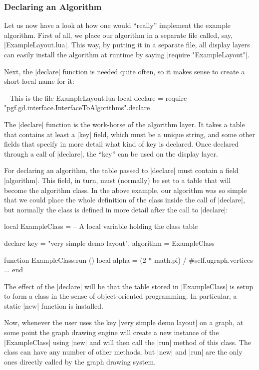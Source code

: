\subsubsection{Declaring an Algorithm}

Let us now have a look at how one would ``really'' implement the example
algorithm. First of all, we place our algorithm in a separate file called, say,
|ExampleLayout.lua|. This way, by putting it in a separate file, all display
layers can easily install the algorithm at runtime by saying
|require "ExampleLayout"|.

Next, the |declare| function is needed quite often, so it makes sense to create
a short local name for it:
%
\begin{codeexample}[code only, tikz syntax=false]
-- This is the file ExampleLayout.lua
local declare = require "pgf.gd.interface.InterfaceToAlgorithms".declare
\end{codeexample}

The |declare| function is the work-horse of the algorithm layer. It takes a
table that contains at least a |key| field, which must be a unique string, and
some other fields that specify in more detail what kind of key is declared.
Once declared through a call of |declare|, the ``key'' can be used on the
display layer.

For declaring an algorithm, the table passed to |declare| must contain a field
|algorithm|. This field, in turn, must (normally) be set to a table that will
become the algorithm class. In the above example, our algorithm was so simple
that we could place the whole definition of the class inside the call of
|declare|, but normally the class is defined in more detail after the call to
|declare|:
%
\begin{codeexample}[code only, tikz syntax=false]
local ExampleClass = {}  -- A local variable holding the class table

declare {
  key = "very simple demo layout",
  algorithm = ExampleClass
}

function ExampleClass:run ()
  local alpha = (2 * math.pi) / #self.ugraph.vertices
  ...
end
\end{codeexample}

The effect of the |declare| will be that the table stored in |ExampleClass| is
setup to form a class in the sense of object-oriented programming. In
particular, a static |new| function is installed.

Now, whenever the user uses the key |very simple demo layout| on a graph, at
some point the graph drawing engine will create a new instance of the
|ExampleClass| using |new| and will then call the |run| method of this class.
The class can have any number of other methods, but |new| and |run| are the
only ones directly called by the graph drawing system.


